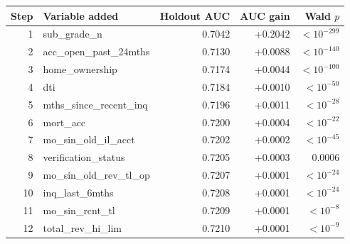 \begin{tabular}{rlrrr}
\toprule
Step & Variable added & Holdout AUC & AUC gain & Wald $p$ \\
\midrule
1 & sub\_grade\_n & 0.7042 & +0.2042 & $<10^{-299}$ \\
2 & acc\_open\_past\_24mths & 0.7130 & +0.0088 & $<10^{-140}$ \\
3 & home\_ownership & 0.7174 & +0.0044 & $<10^{-100}$ \\
4 & dti & 0.7184 & +0.0010 & $<10^{-50}$ \\
5 & mths\_since\_recent\_inq & 0.7196 & +0.0011 & $<10^{-28}$ \\
6 & mort\_acc & 0.7200 & +0.0004 & $<10^{-22}$ \\
7 & mo\_sin\_old\_il\_acct & 0.7202 & +0.0002 & $<10^{-45}$ \\
8 & verification\_status & 0.7205 & +0.0003 & 0.0006 \\
9 & mo\_sin\_old\_rev\_tl\_op & 0.7207 & +0.0001 & $<10^{-24}$ \\
10 & inq\_last\_6mths & 0.7208 & +0.0001 & $<10^{-24}$ \\
11 & mo\_sin\_rcnt\_tl & 0.7209 & +0.0001 & $<10^{-8}$ \\
12 & total\_rev\_hi\_lim & 0.7210 & +0.0001 & $<10^{-9}$ \\
\bottomrule
\end{tabular}
